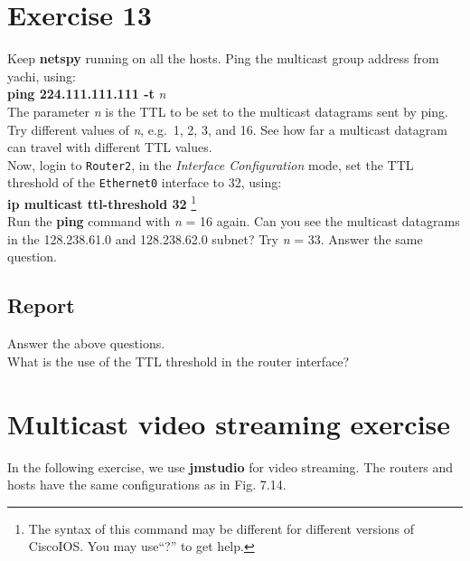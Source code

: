 \documentclass[10pt,a4paper]{article}
\numberwithin{equation}{section}
\numberwithin{figure}{section}
\numberwithin{table}{section}
\begin{document}
    \section{ Exercise 13}
    Keep \textbf{netspy} running on all the hosts.
    Ping the multicast group address from yachi, using: \\
    \textbf{ping 224.111.111.111 -t} \textit{n} \\
    The parameter \textit{n} is the TTL to be set to the multicast datagrams sent by ping.
    Try different values of \textit{n}, e.g.\  1, 2, 3, and 16.
    See how far a multicast datagram can travel with different TTL values. \\
    Now, login to \texttt{Router2}, in the \textit{Interface Configuration} mode, set the TTL threshold of the \texttt{Ethernet0} interface to 32, using: \\
    \textbf{ip multicast ttl-threshold 32}
    \footnote{The syntax of this command may be different for different versions of CiscoIOS. You may use“?” to get help.} \\
    Run the \textbf{ping} command with \textit{n} = 16 again.
    Can you see the multicast datagrams in the 128.238.61.0 and 128.238.62.0 subnet?
    Try \textit{n} = 33.
    Answer the same question.
    \subsection*{Report}
    Answer the above questions. \\
    What is the use of the TTL threshold in the router interface?

    \section*{Multicast video streaming exercise}
    In the following exercise, we use \textbf{jmstudio} for video streaming.
    The routers and hosts have the same configurations as in Fig. 7.14.
\end{document}
